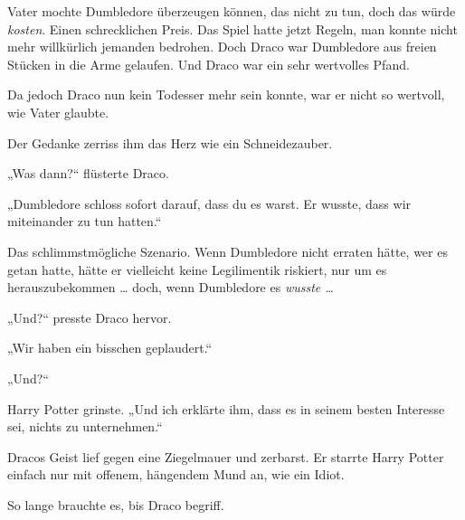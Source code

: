 Vater mochte Dumbledore überzeugen können, das nicht zu tun, doch das würde \emph{kosten}. Einen schrecklichen Preis. Das Spiel hatte jetzt Regeln, man konnte nicht mehr willkürlich jemanden bedrohen. Doch Draco war Dumbledore aus freien Stücken in die Arme gelaufen. Und Draco war ein sehr wertvolles Pfand.

Da jedoch Draco nun kein Todesser mehr sein konnte, war er nicht so wertvoll, wie Vater glaubte.

Der Gedanke zerriss ihm das Herz wie ein Schneidezauber.

„Was dann?“ flüsterte Draco.

„Dumbledore schloss sofort darauf, dass du es warst. Er wusste, dass wir miteinander zu tun hatten.“

Das schlimmstmögliche Szenario. Wenn Dumbledore nicht erraten hätte, wer es getan hatte, hätte er vielleicht keine Legilimentik riskiert, nur um es herauszubekommen … doch, wenn Dumbledore es \emph{wusste …}

„Und?“ presste Draco hervor.

„Wir haben ein bisschen geplaudert.“

„Und?“

Harry Potter grinste.
„Und ich erklärte ihm, dass es in seinem besten Interesse sei, nichts zu unternehmen.“

Dracos Geist lief gegen eine Ziegelmauer und zerbarst. Er starrte Harry Potter einfach nur mit offenem, hängendem Mund an, wie ein Idiot.

So lange brauchte es, bis Draco begriff.

